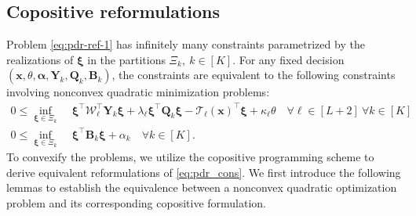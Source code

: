 \documentclass{article}
\newcommand{\RR}{\mathbb{R}}
\begin{document}
\subsection{Copositive reformulations}
\label{copositive_reformulations}


Problem \eqref{eq:pdr-ref-1} has infinitely many constraints parametrized by the realizations of $\bm \xi$ in the partitions $\Xi_k, \ k \in [K]$. For any fixed decision $\left( \bm x, \theta, \bm \alpha, \bm Y_k, \bm Q_k , \bm B_k\right )$, the constraints are equivalent to the following constraints involving nonconvex quadratic minimization problems: 
\begin{subequations}
\label{eq:pdr_cons}
\begin{align}
    \displaystyle 0\leq\inf_{\bm \xi \in  \Xi_{k}} & \; \bm \xi^\top \bm{\mathcal{W}}^\top_\ell \bm Y_k \bm\xi + \lambda_\ell \bm \xi^\top \bm Q_k \bm \xi - \bm{\mathcal{T}}_\ell (\bm x)^\top \bm\xi + \kappa_\ell \theta \quad \forall \ell \in [L+2] \ \forall k \in [K]  \label{eq:pdr_cons1} \\
    \displaystyle 0 \leq \inf_{\bm \xi \in  \Xi_{k}} &\; \bm \xi^\top \bm B_k \bm \xi + \alpha_k \quad \forall k \in [K]. \label{eq:pdr_cons2}
\end{align}
\end{subequations}
To convexify the problems, we utilize the copositive programming scheme to derive equivalent reformulations of \eqref{eq:pdr_cons}. We first introduce the following lemmas to establish the equivalence between a nonconvex quadratic optimization problem and its corresponding copositive formulation.
\end{document}
